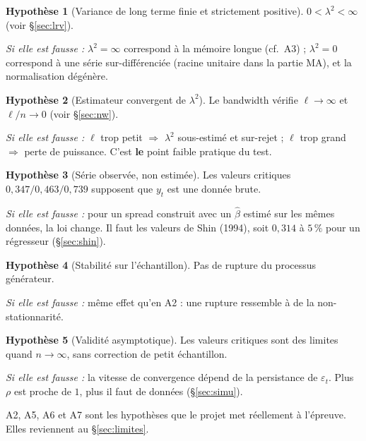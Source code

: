 \documentclass[11pt,a4paper]{article}
\theoremstyle{definition}
\newtheorem{hyp}{Hypothèse}
\begin{document}
\begin{hyp}[Variance de long terme finie et strictement positive]
$0 < \lambda^2 < \infty$ (voir \S\ref{sec:lrv}).

\emph{Si elle est fausse :} $\lambda^2 = \infty$ correspond à la mémoire longue (cf.~A3) ; $\lambda^2 = 0$ correspond à une série sur-différenciée (racine unitaire dans la partie MA), et la normalisation dégénère.
\end{hyp}

\begin{hyp}[Estimateur convergent de $\lambda^2$]
Le bandwidth vérifie $\ell \to \infty$ et $\ell/n \to 0$ (voir \S\ref{sec:nw}).

\emph{Si elle est fausse :} $\ell$ trop petit $\Rightarrow$ $\lambda^2$ sous-estimé et sur-rejet ; $\ell$ trop grand $\Rightarrow$ perte de puissance. C'est \textbf{le} point faible pratique du test.
\end{hyp}

\begin{hyp}[Série observée, non estimée]
Les valeurs critiques $0{,}347 / 0{,}463 / 0{,}739$ supposent que $y_t$ est une donnée brute.

\emph{Si elle est fausse :} pour un spread construit avec un $\hat\beta$ estimé sur les mêmes données, la loi change. Il faut les valeurs de Shin (1994), soit $0{,}314$ à $5\,\%$ pour un régresseur (\S\ref{sec:shin}).
\end{hyp}

\begin{hyp}[Stabilité sur l'échantillon]
Pas de rupture du processus générateur.

\emph{Si elle est fausse :} même effet qu'en A2 : une rupture ressemble à de la non-stationnarité.
\end{hyp}

\begin{hyp}[Validité asymptotique]
Les valeurs critiques sont des limites quand $n \to \infty$, sans correction de petit échantillon.

\emph{Si elle est fausse :} la vitesse de convergence dépend de la persistance de $\varepsilon_t$. Plus $\rho$ est proche de $1$, plus il faut de données (\S\ref{sec:simu}).
\end{hyp}

\begin{retenir}
A2, A5, A6 et A7 sont les hypothèses que le projet met réellement à l'épreuve. Elles reviennent au \S\ref{sec:limites}.
\end{retenir}
\end{document}
